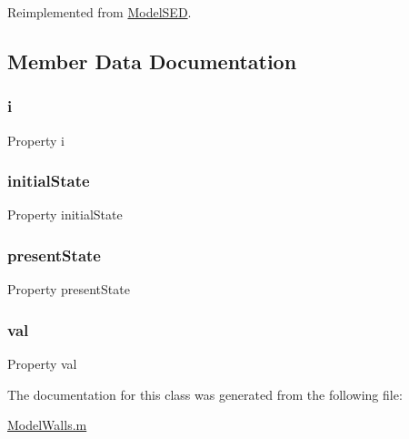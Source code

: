 Reimplemented from \hyperlink{class_model_s_e_d_adb8aaccb857cf5bbec640cd00915459d}{Model\+S\+ED}.



\subsection{Member Data Documentation}
\mbox{\label{class_model_walls_a103c618d75e54c3a72fac6bcaa59f61f}} 
\subsubsection{\texorpdfstring{i}{i}}
{\footnotesize\ttfamily Property i}

\mbox{\label{class_model_walls_acd9263acfa96c9138afdf497e55acc24}} 
\subsubsection{\texorpdfstring{initial\+State}{initialState}}
{\footnotesize\ttfamily Property initial\+State}

\mbox{\label{class_model_walls_a9624cc7c421a50fa5086b0ebd0cd5fe3}} 
\subsubsection{\texorpdfstring{present\+State}{presentState}}
{\footnotesize\ttfamily Property present\+State}

\mbox{\label{class_model_walls_aae3a423b8c844683e2adba0472347fe1}} 
\subsubsection{\texorpdfstring{val}{val}}
{\footnotesize\ttfamily Property val}



The documentation for this class was generated from the following file\+:\begin{DoxyCompactItemize}
\item 
\hyperlink{_model_walls_8m}{Model\+Walls.\+m}\end{DoxyCompactItemize}
